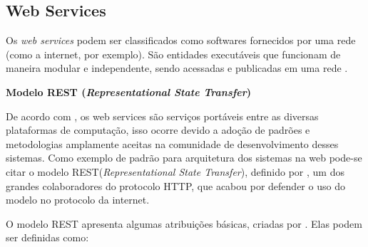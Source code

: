 \subsection{Web Services}

Os \textit{web services} podem ser classificados como softwares fornecidos por uma rede (como a internet, por exemplo). São entidades executáveis que funcionam de maneira modular e independente, sendo acessadas e publicadas em uma rede \cite{falter2009system}.
 
 \textbf{Modelo REST (\textit{Representational State Transfer})}
 
 De acordo com , os web services são serviços portáveis entre as diversas plataformas de computação, isso ocorre devido a adoção de padrões e metodologias amplamente aceitas na comunidade de desenvolvimento desses sistemas. Como exemplo de padrão para arquitetura dos sistemas na web pode-se citar o modelo REST(\textit{Representational State Transfer}), definido por , um dos grandes colaboradores do protocolo HTTP, que acabou por defender o uso do modelo no protocolo da internet.

O modelo REST apresenta algumas atribuições básicas, criadas por \cite{fielding2000architectural}. Elas podem ser definidas como:

